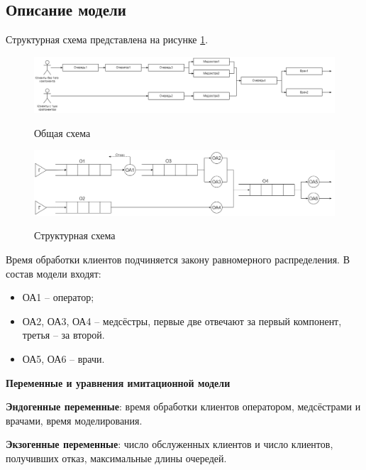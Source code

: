 \subsection{Описание модели}
Структурная схема представлена на рисунке \ref{fig1:image}.

\begin{figure}[h]
	\begin{center}
		{\includegraphics[scale = 0.37]{img/struct.png}}
		\caption{Общая схема}
		\label{fig1:image}
	\end{center}
\end{figure}

\begin{figure}[h]
	\begin{center}
		{\includegraphics[scale = 0.37]{img/schema.png}}
		\caption{Структурная схема}
		\label{fig2:image}
	\end{center}
\end{figure}

\newpage


Время обработки клиентов подчиняется закону равномерного распределения. 
%
В состав модели входят: 
%
\begin{itemize}
	\item ОА1 -- оператор;
	
	\item ОА2, ОА3, ОА4 -- медсёстры, первые две отвечают за первый компонент, третья -- за второй.
	
	\item ОА5, ОА6 -- врачи.
\end{itemize}

\textbf{Переменные и уравнения имитационной модели}  

\textbf{Эндогенные переменные}: время обработки клиентов оператором, медсёстрами и врачами, время моделирования.

\textbf{Экзогенные переменные}: число обслуженных клиентов и число клиентов, получивших отказ, максимальные длины очередей.

